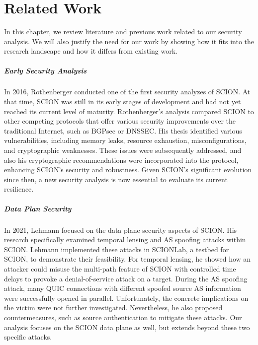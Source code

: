\chapter{Related Work}
\label{ch:related-work}


In this chapter, we review literature and previous work related to our security analysis.
We will also justify the need for our work by showing how it fits into the research landscape and how it differs from existing work.

\paragraph{Early Security Analysis}
In 2016, Rothenberger \cite{Rothenberger2016} conducted one of the first security analyzes of SCION.
At that time, SCION was still in its early stages of development and had not yet reached its current level of maturity.
Rothenberger's analysis compared SCION to other competing protocols that offer various security improvements over the traditional Internet, such as BGPsec or DNSSEC.
His thesis identified various vulnerabilities, including memory leaks, resource exhaustion, misconfigurations, and cryptographic weaknesses.
These issues were subsequently addressed, and also his cryptographic recommendations were incorporated into the protocol, enhancing SCION's security and robustness.
Given SCION's significant evolution since then, a new security analysis is now essential to evaluate its current resilience.

\paragraph{Data Plan Security}
In 2021, Lehmann \cite{Lehmann2021} focused on the data plane security aspects of SCION.
His research specifically examined temporal lensing and AS spoofing attacks within SCION.
Lehmann implemented these attacks in SCIONLab, a testbed for SCION, to demonstrate their feasibility.
For temporal lensing, he showed how an attacker could misuse the multi-path feature of SCION with controlled time delays to provoke a denial-of-service attack on a target.
During the AS spoofing attack, many QUIC connections with different spoofed source AS information were successfully opened in parallel.
Unfortunately, the concrete implications on the victim were not further investigated.
Nevertheless, he also proposed countermeasures, such as source authentication to mitigate these attacks.
Our analysis focuses on the SCION data plane as well, but extends beyond these two specific attacks.


